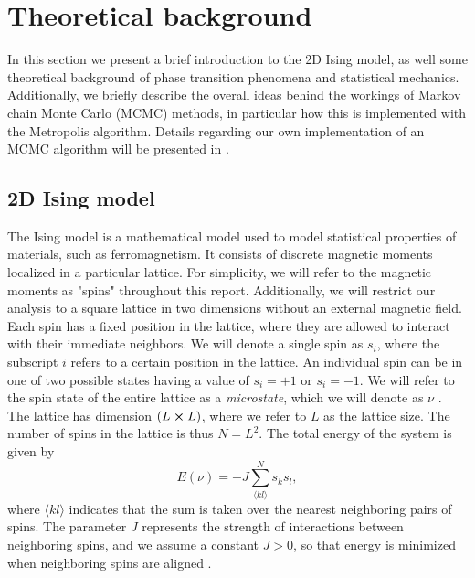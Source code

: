 \section{Theoretical background}\label{sec:theory}

In this section we present a brief introduction to the 2D Ising model, as well some theoretical background of phase transition phenomena and statistical mechanics. Additionally, we briefly describe the overall ideas behind the workings of Markov chain Monte Carlo (MCMC) methods, in particular how this is implemented with the Metropolis algorithm. Details regarding our own implementation of an MCMC algorithm will be presented in .    

\subsection{2D Ising model}\label{subsec_theory:ising_2d}
The Ising model is a mathematical model used to model statistical properties of materials, such as ferromagnetism. It consists of discrete magnetic moments localized in a particular lattice. For simplicity, we will refer to the magnetic moments as "spins" throughout this report. Additionally, we will restrict our analysis to a square lattice in two dimensions without an external magnetic field. Each spin has a fixed position in the lattice, where they are allowed to interact with their immediate neighbors. We will denote a single spin as $s_i$, where the subscript $i$ refers to a certain position in the lattice. An individual spin can be in one of two possible states having a value of $s_i=+1$ or $s_i=-1$. We will refer to the  spin state of the entire lattice as a \textit{microstate}, which we will denote as $\nu$ . The lattice has dimension $(L\cross L)$, where we refer to $L$ as the lattice size. The number of  spins in the lattice is thus $N=L^2$.  The total energy of the system is given by 
\begin{equation} \label{eq:energy}
    E(\nu) = -J \sum_{\langle kl \rangle}^N s_k s_l,
\end{equation}
where $\langle kl\rangle$ indicates that the sum is taken over the nearest neighboring pairs of spins.  The parameter $J$ represents the strength of interactions between neighboring spins, and we assume a constant $J>0$, so that energy is minimized when neighboring spins are aligned . 

